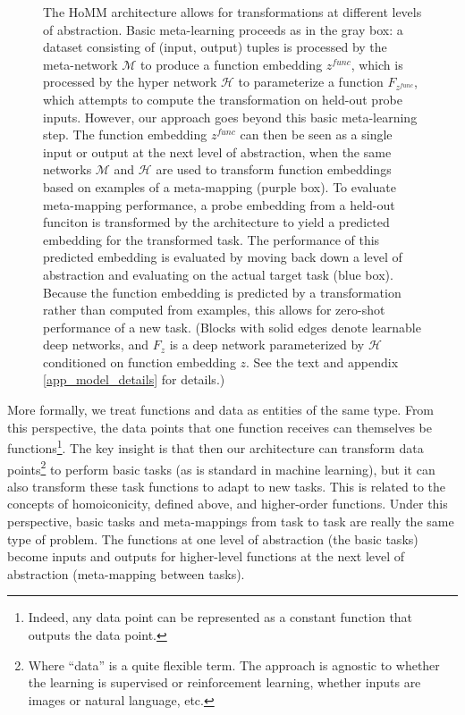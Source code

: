 \documentclass{article}
\begin{document}
\begin{figure}
\caption{The HoMM architecture allows for transformations at different levels of abstraction. Basic meta-learning proceeds as in the gray box: a dataset consisting of (input, output) tuples is processed by the meta-network \(\mathcal{M}\) to produce a function embedding \(z^{func}\), which is processed by the hyper network \(\mathcal{H}\) to parameterize a function \(F_{z^{func}}\), which attempts to compute the transformation on held-out probe inputs. However, our approach goes beyond this basic meta-learning step. The function embedding \(z^{func}\) can then be seen as a single input or output at the next level of abstraction, when the same networks \(\mathcal{M}\) and \(\mathcal{H}\) are used to transform function embeddings based on examples of a meta-mapping (purple box). To evaluate meta-mapping performance, a probe embedding from a held-out funciton is transformed by the architecture to yield a predicted embedding for the transformed task. The performance of this predicted embedding is evaluated by moving back down a level of abstraction and evaluating on the actual target task (blue box). Because the function embedding is predicted by a transformation rather than computed from examples, this allows for zero-shot performance of a new task. (Blocks with solid edges denote learnable deep networks, and $F_{z}$ is a deep network parameterized by $\mathcal{H}$ conditioned on function embedding \(z\). See the text and appendix \ref{app_model_details} for details.)} \label{architecture_inference_fig}
\end{figure}
More formally, we treat functions and data as entities of the same type. From this perspective, the data points that one function receives can themselves be functions\footnote{Indeed, any data point can be represented as a constant function that outputs the data point.}. The key insight is that then our architecture can transform data points\footnote{Where ``data'' is a quite flexible term. The approach is agnostic to whether the learning is supervised or reinforcement learning, whether inputs are images or natural language, etc.} to perform basic tasks (as is standard in machine learning), but it can also transform these task functions to adapt to new tasks. This is related to the concepts of homoiconicity, defined above, and higher-order functions. Under this perspective, basic tasks and meta-mappings from task to task are really the same type of problem. The functions at one level of abstraction (the basic tasks) become inputs and outputs for higher-level functions at the next level of abstraction (meta-mapping between tasks). \par
\end{document}
